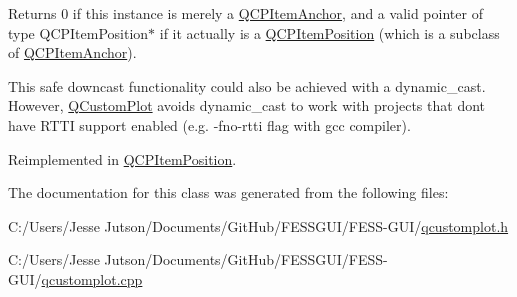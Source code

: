 Returns 0 if this instance is merely a \hyperlink{class_q_c_p_item_anchor}{Q\+C\+P\+Item\+Anchor}, and a valid pointer of type Q\+C\+P\+Item\+Position$\ast$ if it actually is a \hyperlink{class_q_c_p_item_position}{Q\+C\+P\+Item\+Position} (which is a subclass of \hyperlink{class_q_c_p_item_anchor}{Q\+C\+P\+Item\+Anchor}).

This safe downcast functionality could also be achieved with a dynamic\+\_\+cast. However, \hyperlink{class_q_custom_plot}{Q\+Custom\+Plot} avoids dynamic\+\_\+cast to work with projects that don\textquotesingle{}t have R\+T\+TI support enabled (e.\+g. -\/fno-\/rtti flag with gcc compiler). 

Reimplemented in \hyperlink{class_q_c_p_item_position_a577a7efc601df85a20b3e709d1ac320e}{Q\+C\+P\+Item\+Position}.



The documentation for this class was generated from the following files\+:\begin{DoxyCompactItemize}
\item 
C\+:/\+Users/\+Jesse Jutson/\+Documents/\+Git\+Hub/\+F\+E\+S\+S\+G\+U\+I/\+F\+E\+S\+S-\/\+G\+U\+I/\hyperlink{qcustomplot_8h}{qcustomplot.\+h}\item 
C\+:/\+Users/\+Jesse Jutson/\+Documents/\+Git\+Hub/\+F\+E\+S\+S\+G\+U\+I/\+F\+E\+S\+S-\/\+G\+U\+I/\hyperlink{qcustomplot_8cpp}{qcustomplot.\+cpp}\end{DoxyCompactItemize}
